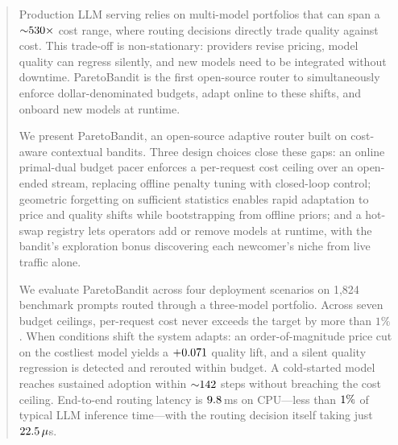 \begin{abstract}
Production LLM serving relies on multi-model portfolios that can span a ${\sim}\ppPriceRangeX\times$ cost range, where routing decisions directly trade quality against cost. This trade-off is non-stationary: providers revise pricing, model quality can regress silently, and new models need to be integrated without downtime. ParetoBandit is the first open-source router to simultaneously enforce dollar-denominated budgets, adapt online to these shifts, and onboard new models at runtime.

We present ParetoBandit, an open-source adaptive router built on cost-aware contextual bandits. Three design choices close these gaps: an online primal-dual budget pacer enforces a per-request cost ceiling over an open-ended stream, replacing offline penalty tuning with closed-loop control; geometric forgetting on sufficient statistics enables rapid adaptation to price and quality shifts while bootstrapping from offline priors; and a hot-swap registry lets operators add or remove models at runtime, with the bandit's exploration bonus discovering each newcomer's niche from live traffic alone.

We evaluate ParetoBandit across four deployment scenarios on 1,824 benchmark prompts routed through a three-model portfolio. Across seven budget ceilings, per-request cost never exceeds the target by more than $1\%$. When conditions shift the system adapts: an order-of-magnitude price cut on the costliest model yields a $+\ppMaxQualityLift$ quality lift, and a silent quality regression is detected and rerouted within budget. A cold-started model reaches sustained adoption within ${\sim}\ppAdoptionSteps$ steps without breaching the cost ceiling. End-to-end routing latency is $\ppEteTotalMedianMs$\,ms on CPU---less than $\ppEteRoutePctOfTotal\%$ of typical LLM inference time---with the routing decision itself taking just $\ppPBRouteMedianUs\,\mu$s.
\end{abstract}
